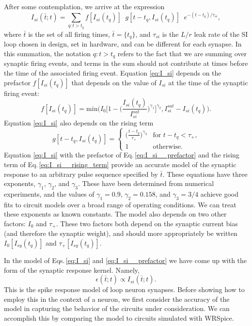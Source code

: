 \documentclass[]{article}
\begin{document}
After some contemplation, we arrive at the expression
\begin{equation}
\label{eq:I_si}
I_{si}(\bar{t};t) = \sum_{q: t>t_{q}} f[I_{si}(t_{q})]\phantom{a}g[t-t_q,I_{si}(t_{q})]\phantom{a}e^{-(t-t_{q})/\tau_{si}},
\end{equation}
where $\bar{t}$ is the set of all firing times, $\bar{t} = \{t_q\}$, and $\tau_{si}$ is the $L/r$ leak rate of the SI loop chosen in design, set in hardware, and can be different for each synapse. In this summation, the notation $q:t>t_q$ refers to the fact that we are summing over synaptic firing events, and terms in the sum should not contribute at times before the time of the associated firing event. Equation \ref{eq:I_si} depends on the prefactor $f[I_{si}(t_q)]$ that depends on the value of $I_{si}$ at the time of the synaptic firing event:
\begin{equation}
\label{eq:I_si__prefactor}
f[I_{si}(t_q)] = \mathrm{min}\bigg(I_0\bigg[1-\bigg(\frac{I_{si}(t_q)}{I_{si}^{sat}}\bigg)^{\gamma_1}\bigg]^{\gamma_2},I_{si}^{sat}-I_{si}(t_q)\bigg).
\end{equation}
Equation \ref{eq:I_si} also depends on the rising term
\begin{equation}
\label{eq:I_si__rising_term}
g[t-t_q,I_{si}(t_q)]= 
\begin{cases}
   \bigg(\frac{t-t_q}{\tau_+}\bigg)^{\gamma_3} & \text{for }t-t_q<\tau_+\text{,}\\
    1              & \text{otherwise.}
\end{cases}
\end{equation}
Equation \ref{eq:I_si} with the prefactor of Eq.\,\ref{eq:I_si__prefactor} and the rising term of Eq.\,\ref{eq:I_si__rising_term} provide an accurate model of the synaptic response to an arbitrary pulse sequence specified by $\bar{t}$. These equations have three exponents, $\gamma_1$, $\gamma_2$, and $\gamma_3$. These have been determined from numerical experiments, and the values of $\gamma_1 = 0.9$, $\gamma_2 = 0.158$, and $\gamma_3 = 3/4$ achieve good fits to circuit models over a broad range of operating conditions. We can treat these exponents as known constants. The model also depends on two other factors: $I_0$ and $\tau_+$. These two factors both depend on the synaptic current bias (and therefore the synaptic weight), and should more appropriately be written $I_0[I_{sy}(t_q)]$ and $\tau_+[I_{sy}(t_q)]$. 

In the model of Eqs.\,\ref{eq:I_si} and \ref{eq:I_si__prefactor} we have come up with the form of the synaptic response kernel. Namely, 
\begin{equation}
\label{eq:I_si__synaptic_response_kernel}
\epsilon(\bar{t};t) \propto I_{si}(\bar{t};t).
\end{equation}
This is the spike response model of loop neuron synapses. Before showing how to employ this in the context of a neuron, we first consider the accuracy of the model in capturing the behavior of the circuits under consideration. We can accomplish this by comparing the model to circuits simulated with WRSpice.
\end{document}
